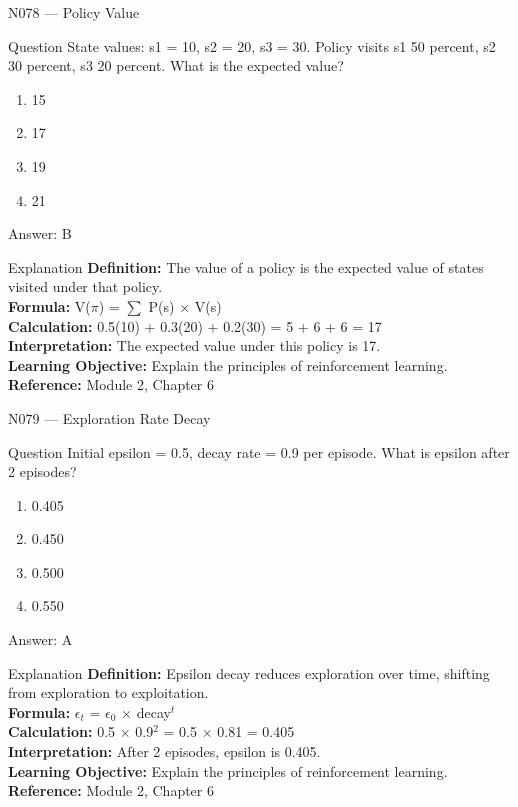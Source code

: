 \documentclass[aspectratio=169,8pt]{beamer}
\begin{document}
	\begin{frame}{N078 --- Policy Value}
		\begin{block}{Question}
			State values: s1 = 10, s2 = 20, s3 = 30. Policy visits s1 50 percent, s2 30 percent, s3 20 percent. What is the expected value?
			\begin{enumerate}
				\item 15
				\item 17
				\item 19
				\item 21
			\end{enumerate}
		\end{block}
		\begin{exampleblock}{Answer: B}\end{exampleblock}
		\begin{block}{Explanation}
			\textbf{Definition:} The value of a policy is the expected value of states visited under that policy.\\
			\textbf{Formula:} V($\pi$) = $\sum$ P(s) $\times$ V(s)\\
			\textbf{Calculation:} 0.5(10) + 0.3(20) + 0.2(30) = 5 + 6 + 6 = 17\\
			\textbf{Interpretation:} The expected value under this policy is 17.\\
			\textbf{Learning Objective:} Explain the principles of reinforcement learning.\\
			\textbf{Reference:} Module 2, Chapter 6
		\end{block}
	\end{frame}
	
	\begin{frame}{N079 --- Exploration Rate Decay}
		\begin{block}{Question}
			Initial epsilon = 0.5, decay rate = 0.9 per episode. What is epsilon after 2 episodes?
			\begin{enumerate}
				\item 0.405
				\item 0.450				\item 0.500
				\item 0.550
			\end{enumerate}
		\end{block}
		\begin{exampleblock}{Answer: A}\end{exampleblock}
		\begin{block}{Explanation}
			\textbf{Definition:} Epsilon decay reduces exploration over time, shifting from exploration to exploitation.\\
			\textbf{Formula:} $\epsilon$$_{t}$ = $\epsilon$$_{0}$ $\times$ decay$^{t}$\\
			\textbf{Calculation:} 0.5 $\times$ 0.9$^{2}$ = 0.5 $\times$ 0.81 = 0.405\\
			\textbf{Interpretation:} After 2 episodes, epsilon is 0.405.\\
			\textbf{Learning Objective:} Explain the principles of reinforcement learning.\\
			\textbf{Reference:} Module 2, Chapter 6
		\end{block}
	\end{frame}
	
\end{document}
